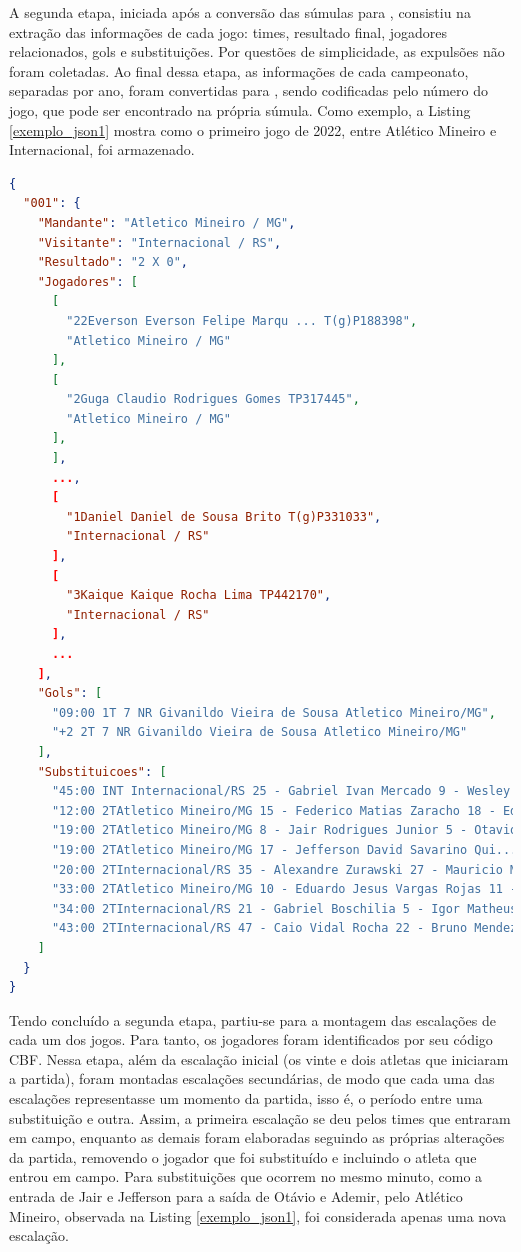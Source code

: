 A segunda etapa, iniciada após a conversão das súmulas para , consistiu na extração das informações de cada jogo: times, resultado final, jogadores relacionados, gols e substituições. Por questões de simplicidade, as expulsões não foram coletadas. Ao final dessa etapa, as informações de cada campeonato, separadas por ano, foram convertidas para , sendo codificadas pelo número do jogo, que pode ser encontrado na própria súmula. Como exemplo, a Listing \ref{exemplo_json1} mostra como o primeiro jogo de 2022, entre Atlético Mineiro e Internacional, foi armazenado.
\begin{lstlisting}[language = json, firstnumber = 1, caption = {Exemplo de JSON obtido após a segunda etapa.}, captionpos = b, label = exemplo_json1]
{
  "001": {
    "Mandante": "Atletico Mineiro / MG",
    "Visitante": "Internacional / RS",
    "Resultado": "2 X 0",
    "Jogadores": [
      [
        "22Everson Everson Felipe Marqu ... T(g)P188398",
        "Atletico Mineiro / MG"
      ],
      [
        "2Guga Claudio Rodrigues Gomes TP317445",
        "Atletico Mineiro / MG"
      ],
      ],
      ...,
      [
        "1Daniel Daniel de Sousa Brito T(g)P331033",
        "Internacional / RS"
      ],
      [
        "3Kaique Kaique Rocha Lima TP442170",
        "Internacional / RS"
      ],
      ...
    ],
    "Gols": [
      "09:00 1T 7 NR Givanildo Vieira de Sousa Atletico Mineiro/MG",
      "+2 2T 7 NR Givanildo Vieira de Sousa Atletico Mineiro/MG"
    ],
    "Substituicoes": [
      "45:00 INT Internacional/RS 25 - Gabriel Ivan Mercado 9 - Wesley Moraes Ferreira da Si...",
      "12:00 2TAtletico Mineiro/MG 15 - Federico Matias Zaracho 18 - Eduardo Colcenti Antunes",
      "19:00 2TAtletico Mineiro/MG 8 - Jair Rodrigues Junior 5 - Otavio Henrique Passos Santos",
      "19:00 2TAtletico Mineiro/MG 17 - Jefferson David Savarino Qui... 19 - Ademir da Silva Santos Junior",
      "20:00 2TInternacional/RS 35 - Alexandre Zurawski 27 - Mauricio Magalhaes Prado",
      "33:00 2TAtletico Mineiro/MG 10 - Eduardo Jesus Vargas Rojas 11 - Marcos da Silva Franca",
      "34:00 2TInternacional/RS 21 - Gabriel Boschilia 5 - Igor Matheus Liziero Pereira",
      "43:00 2TInternacional/RS 47 - Caio Vidal Rocha 22 - Bruno Mendez Cittadini"
    ]
  }
}
\end{lstlisting}

Tendo concluído a segunda etapa, partiu-se para a montagem das escalações de cada um dos jogos. Para tanto, os jogadores foram identificados por seu código CBF. Nessa etapa, além da escalação inicial (os vinte e dois atletas que iniciaram a partida), foram montadas escalações secundárias, de modo que cada uma das escalações representasse um momento da partida, isso é, o período entre uma substituição e outra. Assim, a primeira escalação se deu pelos times que entraram em campo, enquanto as demais foram elaboradas seguindo as próprias alterações da partida, removendo o jogador que foi substituído e incluindo o atleta que entrou em campo. Para substituições que ocorrem no mesmo minuto, como a entrada de Jair e Jefferson para a saída de Otávio e Ademir, pelo Atlético Mineiro, observada na Listing \ref{exemplo_json1}, foi considerada apenas uma nova escalação.

